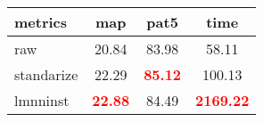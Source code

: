 \begin{tabular}{lccc} 
metrics & map & pat5 & time \\ 
\hline 
raw & 20.84 & 83.98 &   58.11 \\ 
standarize & 22.29 & \textbf{\textcolor{red}{85.12}} &  100.13 \\ 
lmnninst & \textbf{\textcolor{red}{22.88}} & 84.49 & \textbf{\textcolor{red}{2169.22}} \\ 
\end{tabular} 
